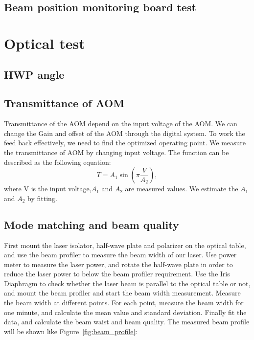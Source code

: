\subsection{Beam position monitoring board test}

\section{Optical test}
\subsection{HWP angle}
\subsection{Transmittance of AOM}
Transmittance of the AOM depend on the input voltage of the AOM. We can change the Gain and offset of the AOM through the digital system. To work the feed back effectively, we need to find the optimized operating point. We measure the transmittance of AOM by changing input voltage. The function can be described as the following equation:
\begin{equation}
T=A_1 \sin{\left( \pi \frac{V}{A_2}\right)},
\end{equation}
where V is the input voltage,$ A_1$ and $A_2$ are measured values. We estimate the $A_1$ and $A_2$ by fitting.
			\begin{center}
                                                   \end{center}

\subsection{Mode matching and beam quality}
First mount the laser isolator, half-wave plate and polarizer on the optical table, and use the \underline{\qquad\qquad} beam profiler to measure the beam width of our laser. Use power meter to measure the laser power, and rotate the half-wave plate in order to reduce the laser power to below the beam profiler requirement. Use the Iris Diaphragm to check whether the laser beam is parallel to the optical table or not, and mount the beam profiler and start the beam width measurement. Measure the beam width at different points. For each point, measure the beam width for one minute, and calculate the mean value and standard deviation. Finally fit the data, and calculate the beam waist and beam quality. The measured beam profile will be shown like Figure~\ref{fig:beam_profile}:

